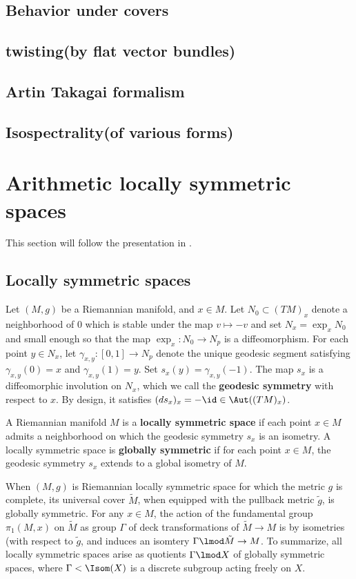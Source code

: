 \subsection{Behavior under covers}
\subsection{twisting(by flat vector bundles)}
\subsection{Artin Takagai formalism}
\subsection{Isospectrality(of various forms)}
\section{Arithmetic locally symmetric spaces}
This section will follow the presentation in \cite{helgasonDifferentialGeometryLie2001}.
\subsection{Locally symmetric spaces}
Let $(M,g)$ be a Riemannian manifold, and $x\in M$. Let $N_0 \subset (T M)_x$ denote a neighborhood of $0$ which is stable under the map $v \mapsto -v$ and set $N_x = \exp_x N_0$ and small enough so that the map $\exp_x: N_0 \to N_p$ is a diffeomorphism.  For each point $y \in N_x$, let $\gamma_{x,y} : [0,1] \to N_p$ denote the unique geodesic segment satisfying $\gamma_{x,y}(0)=x$ and $\gamma_{x,y}(1)=y$. Set $s_x(y) = \gamma_{x,y}(-1)$. The map $s_x$ is a diffeomorphic involution on $N_x$, which we call the \textbf{geodesic symmetry} with respect to $x$. By design, it satisfies $(ds_x)_x = -\id \in \Aut((TM)_x)$.
\begin{defn}
    A Riemannian manifold $M$ is a \textbf{locally symmetric space} if each point $x\in M$ admits a neighborhood on which the geodesic symmetry $s_x$ is an isometry. A locally symmetric space is \textbf{globally symmetric} if for each point $x\in M$, the geodesic symmetry $s_x$ extends to a global isometry of $M$.
\end{defn}
When $(M,g)$ is Riemannian locally symmetric space for which the metric $g$ is complete, its universal cover $\tilde{M}$, when equipped with the pullback metric $\tilde{g}$, is globally symmetric. For any $x\in M$, the action of the fundamental group $\pi_1(M,x)$ on $\tilde{M}$ as group $\Gamma$ of deck transformations of $\tilde{M} \to M$ is by isometries (with respect to $\tilde{g}$, and induces an isomtery $\Gamma \lmod \tilde{M}\to M$. To summarize, all locally symmetric spaces arise as quotients $\Gamma \lmod X$ of globally symmetric spaces, where $\Gamma < \Isom(X)$ is a discrete subgroup acting freely on $X$.

